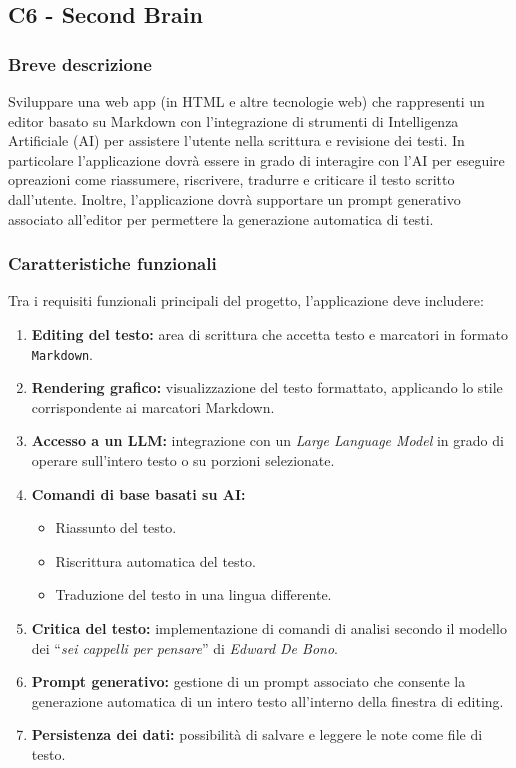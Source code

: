 \documentclass[a4paper,11pt]{article}
\begin{document}
\subsection{C6 - Second Brain}

\subsubsection{Breve descrizione}
Sviluppare una web app (in HTML e altre tecnologie web) che rappresenti un editor basato su Markdown con l'integrazione di strumenti di Intelligenza Artificiale (AI) per assistere l'utente nella scrittura e revisione dei testi.
In particolare l'applicazione dovrà essere in grado di interagire con l'AI per eseguire opreazioni come riassumere, riscrivere, tradurre e criticare il testo scritto dall'utente. Inoltre, l'applicazione dovrà supportare un prompt generativo associato all'editor per permettere la generazione automatica di testi.
\subsubsection{Caratteristiche funzionali}
Tra i requisiti funzionali principali del progetto, l'applicazione deve includere:
\begin{enumerate}[noitemsep, topsep=0pt]
  \item \textbf{Editing del testo:} area di scrittura che accetta testo e marcatori in formato \texttt{Markdown}.
  \item \textbf{Rendering grafico:} visualizzazione del testo formattato, applicando lo stile corrispondente ai marcatori Markdown.
  \item \textbf{Accesso a un LLM:} integrazione con un \textit{Large Language Model} in grado di operare sull'intero testo o su porzioni selezionate.
  \item \textbf{Comandi di base basati su AI:}
  \begin{itemize}
    \item Riassunto del testo.
    \item Riscrittura automatica del testo.
    \item Traduzione del testo in una lingua differente.
  \end{itemize}
  
  \item \textbf{Critica del testo:} implementazione di comandi di analisi secondo il modello dei “\textit{sei cappelli per pensare}” di \textit{Edward De Bono}.
  \item \textbf{Prompt generativo:} gestione di un prompt associato che consente la generazione automatica di un intero testo all'interno della finestra di editing.
  \item \textbf{Persistenza dei dati:} possibilità di salvare e leggere le note come file di testo.
\end{enumerate}
\end{document}
